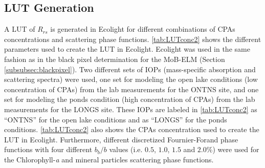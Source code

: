 \documentclass[onecolumn,3p,letterpaper]{elsarticle}
\begin{document}
\subsection{LUT Generation}
\label{subsec:LUT}
A LUT of $R_{rs}$ is generated in Ecolight for different combinations of CPAs concentrations and scattering phase functions. \autoref{tab:LUTconc2} shows the different parameters used to create the LUT in Ecolight. Ecolight was used in the same fashion as in the black pixel determination for the MoB-ELM (Section \ref{subsubsec:blackpixel}). Two different sets of IOPs (mass-specific absorption and scattering spectra) were used, one set for modeling the open lake conditions (low concentration of CPAs) from the lab measurements for the ONTNS site, and one set for modeling the ponds condition (high concentration of CPAs) from the lab measurements for the LONGS site. These IOPs are labeled in \autoref{tab:LUTconc2} as ``ONTNS'' for the open lake conditions and as ``LONGS'' for the ponds conditions. \autoref{tab:LUTconc2} also shows the CPAs concentration used to create the LUT in Ecolight. Furthermore, different discretized Fournier-Forand phase functions with four different $b_b/b$ values (i.e. $0.5$, $1.0$, $1.5$ and $2.0\%$) were used for the Chlorophyll-{\it a} and mineral particles scattering phase functions.
\end{document}
